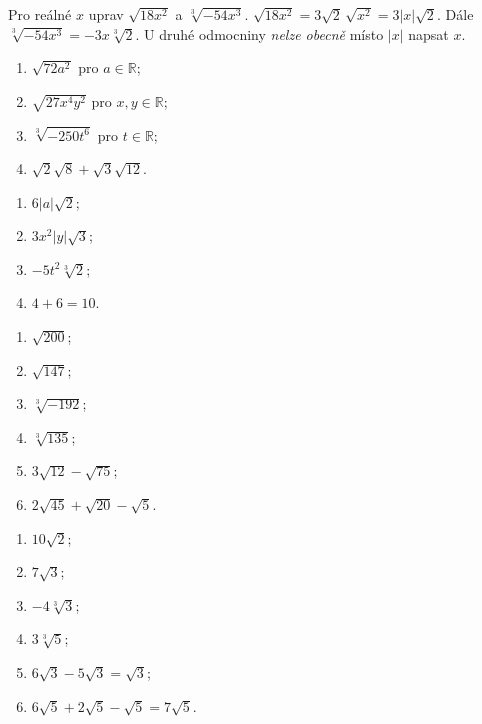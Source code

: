 \documentclass[11pt,a4paper]{article}
\begin{document}
\begin{prikladReseniBox}[breakable=false,title={Příklad 4}]
Pro reálné $x$ uprav $\sqrt{18x^2}$ a $\sqrt[3]{-54x^3}$.
\tcblower
$\sqrt{18x^2}=3\sqrt2\,\sqrt{x^2}=\boxed{3|x|\sqrt2}$.
Dále $\sqrt[3]{-54x^3}=-3x\sqrt[3]2$.
U druhé odmocniny \emph{nelze obecně} místo $|x|$ napsat $x$.
\end{prikladReseniBox}

\begin{zadaniReseniBox}[breakable=false,title={Rozšíření 1}]
\begin{enumerate}[label=\alph*)]
\item $\sqrt{72a^2}$ pro $a\in\mathbb R$;
\item $\sqrt{27x^4y^2}$ pro $x,y\in\mathbb R$;
\item $\sqrt[3]{-250t^6}$ pro $t\in\mathbb R$;
\item $\sqrt{2}\sqrt{8}+\sqrt{3}\sqrt{12}$.
\end{enumerate}
\tcblower
\begin{enumerate}[label=\alph*)]
\item $6|a|\sqrt2$;
\item $3x^2|y|\sqrt3$;
\item $-5t^2\sqrt[3]2$;
\item $4+6=10$.
\end{enumerate}
\end{zadaniReseniBox}

\begin{zadaniReseniBox}[breakable=false,title={Domácí úkol}]
\begin{enumerate}[label=\alph*)]
\item $\sqrt{200}$; \item $\sqrt{147}$; \item $\sqrt[3]{-192}$;
\item $\sqrt[3]{135}$; \item $3\sqrt{12}-\sqrt{75}$;
\item $2\sqrt{45}+\sqrt{20}-\sqrt5$.
\end{enumerate}
\tcblower
\begin{enumerate}[label=\alph*)]
\item $10\sqrt2$; \item $7\sqrt3$; \item $-4\sqrt[3]3$;
\item $3\sqrt[3]5$; \item $6\sqrt3-5\sqrt3=\sqrt3$;
\item $6\sqrt5+2\sqrt5-\sqrt5=7\sqrt5$.
\end{enumerate}
\end{zadaniReseniBox}
\end{document}
